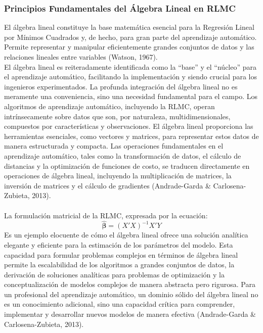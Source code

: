 \documentclass[]{article}
\begin{document}
		\subsubsection{Principios Fundamentales del Álgebra Lineal en RLMC}
		El álgebra lineal constituye la base matemática esencial para la Regresión Lineal por Mínimos Cuadrados y, de hecho, para gran parte del aprendizaje automático. Permite representar y manipular eficientemente grandes conjuntos de datos y las relaciones lineales entre variables (Watson, 1967).\\
		El álgebra lineal es reiteradamente identificada como la ``base'' y el ``núcleo'' para el aprendizaje automático, facilitando la implementación y siendo crucial para los ingenieros experimentados. La profunda integración del álgebra lineal no es meramente una conveniencia, sino una necesidad fundamental para el campo. Los algoritmos de aprendizaje automático, incluyendo la RLMC, operan intrínsecamente sobre datos que son, por naturaleza, multidimensionales, compuestos por características y observaciones. El álgebra lineal proporciona las herramientas esenciales, como vectores y matrices, para representar estos datos de manera estructurada y compacta. Las operaciones fundamentales en el aprendizaje automático, tales como la transformación de datos, el cálculo de distancias y la optimización de funciones de costo, se traducen directamente en operaciones de álgebra lineal, incluyendo la multiplicación de matrices, la inversión de matrices y el cálculo de gradientes (Andrade-Garda \& Carlosena-Zubieta, 2013).\\
		\\
		La formulación matricial de la RLMC, expresada por la ecuación:\\
		\[
		\hat{\bm{\beta}} = (X'X)^{-1} X'Y
		\]
		Es un ejemplo elocuente de cómo el álgebra lineal ofrece una solución analítica elegante y eficiente para la estimación de los parámetros del modelo. Esta capacidad para formular problemas complejos en términos de álgebra lineal permite la escalabilidad de los algoritmos a grandes conjuntos de datos, la derivación de soluciones analíticas para problemas de optimización y la conceptualización de modelos complejos de manera abstracta pero rigurosa. Para un profesional del aprendizaje automático, un dominio sólido del álgebra lineal no es un conocimiento adicional, sino una capacidad crítica para comprender, implementar y desarrollar nuevos modelos de manera efectiva (Andrade-Garda \& Carlosena-Zubieta, 2013).
		\\
		
\end{document}
